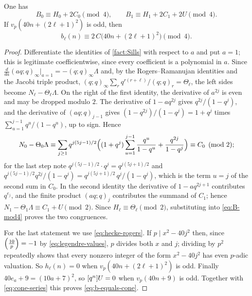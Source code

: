 \begin{proposition}\label{prop:reduction}
One has
\[
  B_0\equiv H_0+2C_0\pmod4,\qquad B_1\equiv H_1+2C_1+2U\pmod4 .
\]
If $v_p(40n+(2\ell+1)^2)$ is odd, then
\begin{equation}\label{eq:b-equals-cone}
  b_\ell(n)\equiv2\,C\bigl(40n+(2\ell+1)^2\bigr)\pmod4 .
\end{equation}
\end{proposition}

\begin{proof}
Differentiate the identities of \cref{fact:Sills} with respect to $a$ and put
$a=1$; this is legitimate coefficientwise, since every coefficient is a
polynomial in $a$. Since $\frac{d}{da}(aq;q)_\infty\big|_{a=1}=-(q;q)_\infty\Lambda$
and, by the Rogers--Ramanujan identities and the Jacobi triple product,
$(q;q)_\infty\sum_rq^{r(r+\ell)}/(q;q)_r=\Theta_\ell$, the left sides become
$N_\ell-\Theta_\ell\Lambda$. On the right of the first identity, the derivative of
$a^{2j}$ is even and may be dropped modulo $2$. The derivative of $1-aq^{2j}$
gives $q^{2j}/(1-q^j)$, and the derivative of $(aq;q)_{j-1}$ gives
$(1-q^{2j})/(1-q^j)=1+q^j$ times $\sum_{u=1}^{j-1}q^u/(1-q^u)$, up to sign. Hence
\[
  N_0-\Theta_0\Lambda\equiv\sum_{j\ge1}q^{j(5j-1)/2}\Bigl((1+q^j)\sum_{u=1}^{j-1}\frac{q^u}{1-q^u}+\frac{q^{2j}}{1-q^j}\Bigr)
  \equiv C_0\pmod2 ;
\]
for the last step note $q^{j(5j-1)/2}\cdot q^j=q^{j(5j+1)/2}$ and
$q^{j(5j-1)/2}q^{2j}/(1-q^j)=q^{j(5j+1)/2}\,q^j/(1-q^j)$, which is the term $u=j$
of the second sum in $C_0$. In the second identity the derivative of
$1-aq^{2j+1}$ contributes $q^{e_j}$, and the finite product $(aq;q)_j$
contributes the summand of $C_1$; hence $N_1-\Theta_1\Lambda\equiv C_1+U\pmod2$.
Since $H_\ell\equiv\Theta_\ell\pmod 2$, substituting into \eqref{eq:B-mod4}
proves the two congruences.

For the last statement we use \eqref{eq:hecke-rogers}. If
$p\mid x^2-40j^2$ then, since $\Bigl(\frac{10}{p}\Bigr)=-1$ by \eqref{eq:legendre-values},
$p$ divides both $x$ and $j$; dividing by $p^2$ repeatedly shows that every
nonzero integer of the form $x^2-40j^2$ has even $p$-adic valuation. So
$h_\ell(n)=0$ when $v_p(40n+(2\ell+1)^2)$ is odd. Finally
$40e_a+9=(10a+7)^2$, so $[q^{n}]U=0$ when $v_p(40n+9)$ is odd. Together with
\eqref{eq:cone-series} this proves \eqref{eq:b-equals-cone}.
\end{proof}
